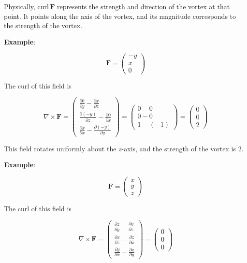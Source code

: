 \documentclass[a4paper,12pt,openany]{book}
\begin{document}
Physically, \(\mathrm{curl}\,\mathbf{F}\) represents the strength and
direction of the vortex at that point. It points along the axis of the
vortex, and its magnitude corresponds to the strength of the vortex.

\textbf{Example}:

\[
\mathbf{F}
=
\begin{pmatrix}
-y\\
x\\
0
\end{pmatrix}
\]

The curl of this field is

\[\nabla \times \mathbf{F} = \begin{pmatrix}
\frac{\partial 0}{\partial y} - \frac{\partial x}{\partial z} \\[0.3em]
\frac{\partial (-y)}{\partial z} - \frac{\partial 0}{\partial x} \\[0.3em]
\frac{\partial x}{\partial x} - \frac{\partial (-y)}{\partial y}
\end{pmatrix} = \begin{pmatrix}
0 - 0 \\ 0 - 0 \\ 1 - (-1)
\end{pmatrix} = \begin{pmatrix} 0 \\ 0 \\ 2 \end{pmatrix}\]

This field rotates uniformly about the \(z\)-axis, and the strength of
the vortex is \(2\).

\textbf{Example}:

\[
\mathbf{F}
=
\begin{pmatrix}
x\\
y\\
z
\end{pmatrix}
\]

The curl of this field is

\[\nabla \times \mathbf{F} = \begin{pmatrix}
\frac{\partial z}{\partial y} - \frac{\partial y}{\partial z} \\[0.3em]
\frac{\partial x}{\partial z} - \frac{\partial z}{\partial x} \\[0.3em]
\frac{\partial y}{\partial x} - \frac{\partial x}{\partial y}
\end{pmatrix} = \begin{pmatrix} 0 \\ 0 \\ 0 \end{pmatrix}\]
\end{document}
